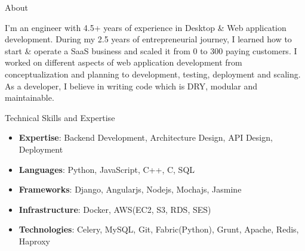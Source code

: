 \documentclass[]{mukeshcv}
\begin{document}
\thispagestyle{empty}


	\makeheader
	
	\begin{cvsection}{About}
		\begin{cvsubsection}{}{}{}
			I'm an engineer with 4.5+ years of experience in Desktop \& Web application development. During my 2.5 years of entrepreneurial journey, I learned how to start \& operate a SaaS business and scaled it from 0 to 300 paying customers. I worked on different aspects of web application development from conceptualization and planning to development, testing, deployment and scaling. As a developer, I believe in writing code which is DRY, modular and maintainable.
		\end{cvsubsection}
	\end{cvsection}

	\begin{cvsection}{Technical Skills and Expertise}
		\begin{cvsubsection}{}{}{}	
			\begin{itemize}
				\item \textbf{Expertise}: Backend Development, Architecture Design, API Design, Deployment
				\item \textbf{Languages}: Python, JavaScript, C++, C, SQL
				\item \textbf{Frameworks}: Django, Angularjs, Nodejs, Mochajs, Jasmine
				\item \textbf{Infrastructure}: Docker, AWS(EC2, S3, RDS, SES)
				\item \textbf{Technologies}: Celery, MySQL, Git, Fabric(Python), Grunt, Apache, Redis, Haproxy

			\end{itemize}
		\end{cvsubsection}
	\end{cvsection}
\end{document}
